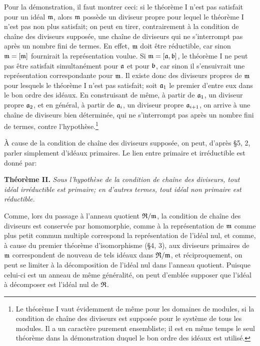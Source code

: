Pour la démonstration, il faut montrer ceci: si le théorème I n'est pas satisfait pour un idéal $\mathfrak{m}$, alors $\mathfrak{m}$ possède un diviseur propre pour lequel le théorème I n'est pas non plus satisfait; on peut en tirer, contrairement à la condition de chaîne des diviseurs supposée, une chaîne de diviseurs qui ne s'interrompt pas après un nombre fini de termes. En effet, $\mathfrak{m}$ doit être réductible, car sinon $\mathfrak{m}=[\mathfrak{m}]$ fournirait la représentation voulue. Si $\mathfrak{m}=[\mathfrak{a},\mathfrak{b}]$, le théorème I ne peut pas être satisfait simultanément pour $\mathfrak{a}$ et pour $\mathfrak{b}$, car sinon il s'ensuivrait une représentation correspondante pour $\mathfrak{m}$. Il existe donc des diviseurs propres de $\mathfrak{m}$ pour lesquels le théorème I n'est pas satisfait; soit $\mathfrak{a}_1$ le premier d'entre eux dans le bon ordre des idéaux. En construisant de même, à partir de $\mathfrak{a}_1$, un diviseur propre $\mathfrak{a}_2$, et en général, à partir de $\mathfrak{a}_i$, un diviseur propre $\mathfrak{a}_{i+1}$, on arrive à une chaîne de diviseurs bien déterminée, qui ne s'interrompt pas après un nombre fini de termes, contre l'hypothèse.\footnote{Le théorème I vaut évidemment de même pour les domaines de modules, si la condition de chaîne des diviseurs est supposée pour le système de tous les modules. Il a un caractère purement ensembliste; il est en même temps le seul théorème dans la démonstration duquel le bon ordre des idéaux est utilisé.}

À cause de la condition de chaîne des diviseurs supposée, on peut, d'après \S{}5, 2, parler simplement d'idéaux primaires. Le lien entre primaire et irréductible est donné par:

\textbf{Théorème II.} \emph{Sous l'hypothèse de la condition de chaîne des diviseurs, tout idéal irréductible est primaire; en d'autres termes, tout idéal non primaire est réductible.}

Comme, lors du passage à l'anneau quotient $\mathfrak{R}/\mathfrak{m}$, la condition de chaîne des diviseurs est conservée par homomorphie, comme à la représentation de $\mathfrak{m}$ comme plus petit commun multiple correspond la représentation de l'idéal nul, et comme, à cause du premier théorème d'isomorphisme (\S{}4, 3), aux diviseurs primaires de $\mathfrak{m}$ correspondent de nouveau de tels idéaux dans $\mathfrak{R}/\mathfrak{m}$, et réciproquement, on peut se limiter à la décomposition de l'idéal nul dans l'anneau quotient. Puisque celui-ci est un anneau de même généralité, on peut d'emblée supposer que l'idéal à décomposer est l'idéal nul de $\mathfrak{R}$.


